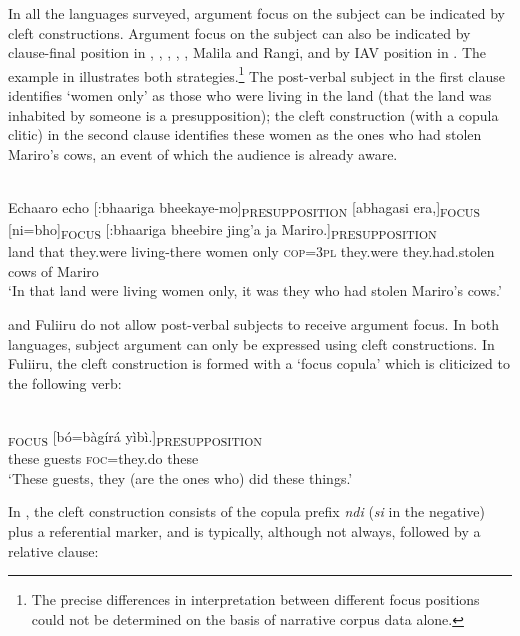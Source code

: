 \documentclass[output=paper]{langsci/langscibook}
\begin{document}
In all the languages surveyed, argument focus on the subject can be indicated by cleft constructions. Argument focus on the subject can also be indicated by clause-final position in , , , , , Malila and Rangi, and by IAV position in . The  example in  illustrates both strategies.\footnote{The precise differences in interpretation between different focus positions could not be determined on the basis of narrative corpus data alone.} The post-verbal subject in the first clause identifies ‘women only’ as those who were living in the land (that the land was inhabited by someone is a presupposition); the cleft construction (with a copula clitic) in the second clause identifies these women as the ones who had stolen Mariro’s cows, an event of which the audience is already aware.

\ea\label{ex:20.nicolle}
\\
\gll Echaaro echo [:bhaariga bheekaye-mo]\textsubscript{PRESUPPOSITION} [abhagasi era,]\textsubscript{FOCUS} [ni=bho]\textsubscript{FOCUS} [:bhaariga bheebire jing’a ja Mariro.]\textsubscript{PRESUPPOSITION}\\
land that {\db}they.were living-there {\db}women only {\db}\textsc{cop=3pl} {\db}they.were they.had.stolen cows of Mariro \\
\glt ‘In that land were living women only, it was they who had stolen Mariro’s cows.’
\z

 and Fuliiru do not allow post-verbal subjects to receive argument focus. In both languages, subject argument can only be expressed using cleft constructions. In Fuliiru, the cleft construction is formed with a ‘focus copula’ which is cliticized to the following verb:

\ea\label{ex:21.nicolle}
\\
\textsubscript{FOCUS} [bó=bàgírá yìbì.]\textsubscript{PRESUPPOSITION}\\
{\db}these guests {\db}\textsc{foc}=they.do these \\
\glt ‘These guests, they (are the ones who) did these things.’
\z

In , the cleft construction consists of the copula prefix \textit{ndi} (\textit{si} in the negative) plus a referential marker, and is typically, although not always, followed by a relative clause:
\end{document}
